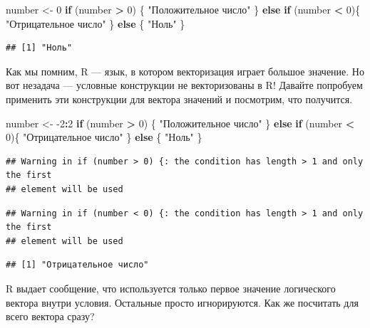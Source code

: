\documentclass[
]{book}
\newenvironment{Shaded}{\begin{snugshade}}{\end{snugshade}}
\newcommand{\ControlFlowTok}[1]{\textcolor[rgb]{0.13,0.29,0.53}{\textbf{#1}}}
\newcommand{\DecValTok}[1]{\textcolor[rgb]{0.00,0.00,0.81}{#1}}
\newcommand{\NormalTok}[1]{#1}
\newcommand{\OperatorTok}[1]{\textcolor[rgb]{0.81,0.36,0.00}{\textbf{#1}}}
\newcommand{\StringTok}[1]{\textcolor[rgb]{0.31,0.60,0.02}{#1}}
\begin{document}
\begin{Shaded}
\begin{Highlighting}[]
\NormalTok{number <-}\StringTok{ }\DecValTok{0}
\ControlFlowTok{if}\NormalTok{ (number }\OperatorTok{>}\StringTok{ }\DecValTok{0}\NormalTok{) \{}
  \StringTok{"Положительное число"}
\NormalTok{\} }\ControlFlowTok{else} \ControlFlowTok{if}\NormalTok{ (number }\OperatorTok{<}\StringTok{ }\DecValTok{0}\NormalTok{)\{}
  \StringTok{"Отрицательное число"}
\NormalTok{\} }\ControlFlowTok{else}\NormalTok{ \{}
  \StringTok{"Ноль"}
\NormalTok{\}}
\end{Highlighting}
\end{Shaded}

\begin{verbatim}
## [1] "Ноль"
\end{verbatim}

Как мы помним, R --- язык, в котором векторизация играет большое значение. Но вот незадача --- условные конструкции не векторизованы в R! Давайте попробуем применить эти конструкции для вектора значений и посмотрим, что получится.

\begin{Shaded}
\begin{Highlighting}[]
\NormalTok{number <-}\StringTok{ }\DecValTok{-2}\OperatorTok{:}\DecValTok{2}
\ControlFlowTok{if}\NormalTok{ (number }\OperatorTok{>}\StringTok{ }\DecValTok{0}\NormalTok{) \{}
  \StringTok{"Положительное число"}
\NormalTok{\} }\ControlFlowTok{else} \ControlFlowTok{if}\NormalTok{ (number }\OperatorTok{<}\StringTok{ }\DecValTok{0}\NormalTok{)\{}
  \StringTok{"Отрицательное число"}
\NormalTok{\} }\ControlFlowTok{else}\NormalTok{ \{}
  \StringTok{"Ноль"}
\NormalTok{\}}
\end{Highlighting}
\end{Shaded}

\begin{verbatim}
## Warning in if (number > 0) {: the condition has length > 1 and only the first
## element will be used
\end{verbatim}

\begin{verbatim}
## Warning in if (number < 0) {: the condition has length > 1 and only the first
## element will be used
\end{verbatim}

\begin{verbatim}
## [1] "Отрицательное число"
\end{verbatim}

R выдает сообщение, что используется только первое значение логического вектора внутри условия. Остальные просто игнорируются. Как же посчитать для всего вектора сразу?
\end{document}
